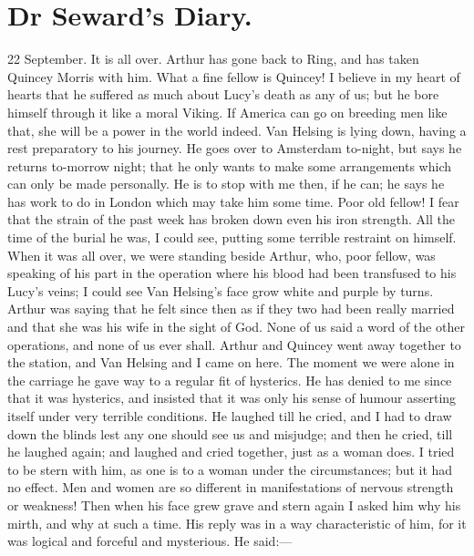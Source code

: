 \section{Dr Seward's Diary.}

\begin{diary}{22 September.}
It is all over. Arthur has gone back to Ring, and has taken Quincey Morris with him. What a fine fellow is Quincey! I believe in my heart of hearts that he suffered as much about Lucy's death as any of us; but he bore himself through it like a moral Viking. If America can go on breeding men like that, she will be a power in the world indeed. Van Helsing is lying down, having a rest preparatory to his journey. He goes over to Amsterdam to-night, but says he returns to-morrow night; that he only wants to make some arrangements which can only be made personally. He is to stop with me then, if he can; he says he has work to do in London which may take him some time. Poor old fellow! I fear that the strain of the past week has broken down even his iron strength. All the time of the burial he was, I could see, putting some terrible restraint on himself. When it was all over, we were standing beside Arthur, who, poor fellow, was speaking of his part in the operation where his blood had been transfused to his Lucy's veins; I could see Van Helsing's face grow white and purple by turns. Arthur was saying that he felt since then as if they two had been really married and that she was his wife in the sight of God. None of us said a word of the other operations, and none of us ever shall. Arthur and Quincey went away together to the station, and Van Helsing and I came on here. The moment we were alone in the carriage he gave way to a regular fit of hysterics. He has denied to me since that it was hysterics, and insisted that it was only his sense of humour asserting itself under very terrible conditions. He laughed till he cried, and I had to draw down the blinds lest any one should see us and misjudge; and then he cried, till he laughed again; and laughed and cried together, just as a woman does. I tried to be stern with him, as one is to a woman under the circumstances; but it had no effect. Men and women are so different in manifestations of nervous strength or weakness! Then when his face grew grave and stern again I asked him why his mirth, and why at such a time. His reply was in a way characteristic of him, for it was logical and forceful and mysterious. He said:—


\end{diary}
